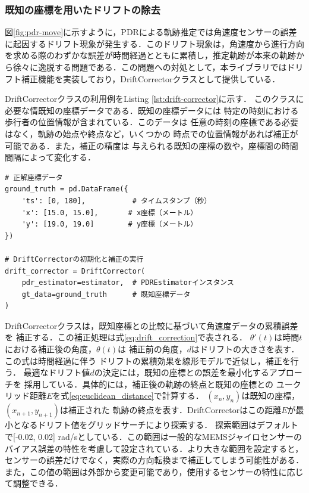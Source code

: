 \subsubsection{既知の座標を用いたドリフトの除去}


図\ref{fig:pdr-move}に示すように，PDRによる軌跡推定では角速度センサーの誤差に起因するドリフト現象が発生する．このドリフト現象は，角速度から進行方向を求める際のわずかな誤差が時間経過とともに累積し，推定軌跡が本来の軌跡から徐々に逸脱する問題である．この問題への対処として，本ライブラリではドリフト補正機能を実装しており，DriftCorrectorクラスとして提供している．


DriftCorrectorクラスの利用例をListing \ref{lst:drift-corrector}に示す．
このクラスに必要な情既知の座標データである．既知の座標データには
特定の時刻における歩行者の位置情報が含まれている．このデータは
任意の時刻の座標である必要はなく，軌跡の始点や終点など，いくつかの
時点での位置情報があれば補正が可能である．また，補正の精度は
与えられる既知の座標の数や，座標間の時間間隔によって変化する．


\begin{lstlisting}[caption={DriftCorrectorの使用例},label=lst:drift-corrector,float=h]
# 正解座標データ
ground_truth = pd.DataFrame({
    'ts': [0, 180],           # タイムスタンプ（秒）
    'x': [15.0, 15.0],       # x座標（メートル）
    'y': [19.0, 19.0]        # y座標（メートル）
})

# DriftCorrectorの初期化と補正の実行
drift_corrector = DriftCorrector(
    pdr_estimator=estimator,  # PDREstimatorインスタンス
    gt_data=ground_truth      # 既知座標データ
)
\end{lstlisting}

DriftCorrectorクラスは，既知座標との比較に基づいて角速度データの累積誤差を
補正する．この補正処理は式\eqref{eq:drift_correction}で表される．
$\theta'(t)$は時間$t$における補正後の角度，$\theta(t)$は
補正前の角度，$d$はドリフトの大きさを表す．この式は時間経過に伴う
ドリフトの累積効果を線形モデルで近似し，補正を行う．
最適なドリフト値$d$の決定には，既知の座標との誤差を最小化するアプローチを
採用している．具体的には，補正後の軌跡の終点と既知の座標との
ユークリッド距離$E$を式\eqref{eq:euclidean_distance}で計算する．
$(x_n, y_n)$は既知の座標，$(x_{n+1}, y_{n+1})$は補正された
軌跡の終点を表す．DriftCorrectorはこの距離$E$が最小となるドリフト値をグリッドサーチにより探索する．
探索範囲はデフォルトで[-0.02, 0.02] rad/sとしている．この範囲は一般的なMEMSジャイロセンサーの
バイアス誤差の特性を考慮して設定されている．より大きな範囲を設定すると，
センサーの誤差だけでなく，実際の方向転換まで補正してしまう可能性がある．
また，この値の範囲は外部から変更可能であり，使用するセンサーの特性に応じて調整できる．


